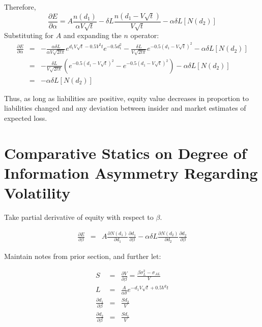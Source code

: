 \documentclass[11pt]{article}
\begin{document}
Therefore, 
\begin{equation}
\frac{\partial E}{\partial \alpha}=A \frac{n\left(d_1\right)}{\alpha V \sqrt{t}}-\delta L\frac{n\left(d_1-V\sqrt{t}\right)}{V\sqrt{t}}-\alpha \delta L \left[N \left(d_2\right)\right]
\end{equation}
Substituting for $A$ and expanding the $n$ operator:
\begin{eqnarray}
\frac{\partial E}{\partial \alpha}&=&-\frac{\alpha \delta L}{\alpha V\sqrt{2t \pi}} e^{d_1 V\sqrt{t}-0.5 V^2 t} e^{-0.5 d_1^2} -\frac{\delta L}{V\sqrt{2t \pi}}e^{-0.5\left(d_1-V\sqrt{t}\right)^2}-\alpha \delta L \left[N \left(d_2\right)\right] \nonumber\\
&=&-\frac{\delta L}{V\sqrt{2t \pi}}\left(e^{-0.5\left(d_1-V\sqrt{t}\right)^2}-e^{-0.5\left(d_1-V\sqrt{t}\right)^2}\right)-\alpha \delta L \left[N\left(d_2\right)\right]\nonumber\\
&=&-\alpha \delta L \left[N\left(d_2\right)\right]
\end{eqnarray}

Thus, as long as liabilities are positive, equity value decreases in proportion to liabilities changed and any deviation between insider and market estimates of expected loss.

\section{Comparative Statics on Degree of Information Asymmetry Regarding Volatility}

Take partial derivative of equity with respect to $\beta$.

\begin{eqnarray}
\frac{\partial E}{\partial \beta}&=&A \frac{\partial N\left(d_1\right)}{\partial d_1}\frac{\partial d_1}{\partial \beta}-\alpha \delta L \frac{\partial N\left(d_2\right)}{\partial d_2}\frac{\partial d_2}{\partial \beta}
\end{eqnarray}

Maintain notes from prior section, and further let:

\begin{eqnarray}
S&=&\frac{\partial V}{\partial \beta}=\frac{\beta \sigma_L^2-\sigma_{AL}}{V} \nonumber\\
L&=&\frac{A}{\alpha \delta}e^{-d_1 V \sqrt{t} + 0.5 V^2 t} \nonumber \\
\frac{\partial d_1}{\partial \beta}&=&\frac{Sd_2}{V}\nonumber \\
\frac{\partial d_2}{\partial \beta}&=&\frac{Sd_1}{V} \nonumber 
\end{eqnarray}
\end{document}
